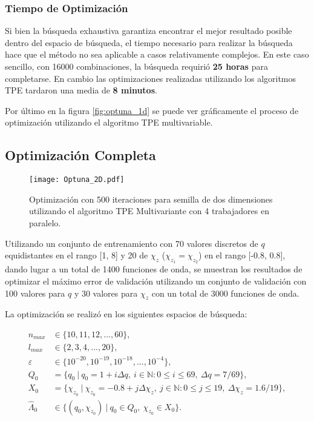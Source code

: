 \subsubsection*{Tiempo de Optimización}

Si bien la búsqueda exhaustiva garantiza encontrar el mejor resultado posible dentro del espacio de búsqueda, el tiempo necesario para realizar la búsqueda hace que el método no sea aplicable a casos relativamente complejos. En este caso sencillo, con 16000 combinaciones, la búsqueda requirió \textbf{25 horas} para completarse. En cambio las optimizaciones realizadas utilizando los algoritmos TPE tardaron una media de \textbf{8 minutos}.

Por último en la figura \ref{fig:optuna_1d} se puede ver gráficamente el proceso de optimización utilizando el algoritmo TPE multivariable.

\subsection{Optimización Completa}

\begin{figure}[p!]
\centering
\texttt{[image: Optuna\_2D.pdf]}
\caption{Optimización con 500 iteraciones para semilla de dos dimensiones utilizando el algoritmo TPE Multivariante con 4 trabajadores en paralelo.}
\label{fig:optuna_2d}
\end{figure}

Utilizando un conjunto de entrenamiento con 70 valores discretos de $q$ equidistantes en el rango [1, 8] y 20 de $\chi_z$ ($\chi_{z_1} = \chi_{z_2}$) en el rango [-0.8, 0.8], dando lugar a un total de 1400 funciones de onda, se muestran los resultados de optimizar el máximo error de validación utilizando un conjunto de validación con 100 valores para $q$ y 30 valores para $\chi_z$ con un total de 3000 funciones de onda.

La optimización se realizó en los siguientes espacios de búsqueda:
 
\begin{align*}
n_{max} &\in \{10, 11, 12, ..., 60\},\\
l_{max} &\in \{2, 3, 4, ..., 20 \},\\
\varepsilon &\in \{ 10^{-20}, 10^{-19}, 10^{-18}, ..., 10^{-4}\},\\
Q_0 &= \{ q_0 \ | \ q_0 = 1 + i \Delta q, \ i\in \mathbb{N} : 0 \le i \le 69, \ \Delta q = 7/69 \},\\
X_0 &= \{\chi_{z_0} \ | \ \chi_{z_0} = -0.8 + j \Delta \chi_z, \ j\in \mathbb{N} : 0 \le j \le 19, \ \Delta \chi_z = 1.6/19 \}, \\
\hat{\Lambda}_0 &\in \{ (q_0, \chi_{z_0}) \ | \ q_0 \in Q_0,\ \chi_{z_0} \in X_0 \}.
\end{align*}


